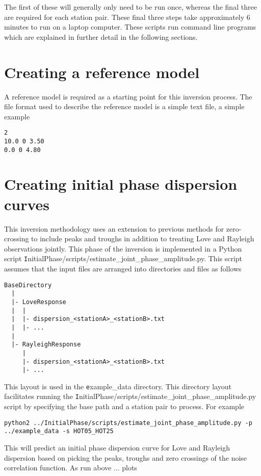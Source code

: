 \documentclass{article}
\begin{document}
The first of these will generally only need to be run once, whereas the final three
are required for each station pair. These final three steps take approximately
6 minutes to run on a laptop computer. These scripts run command line programs which
are explained in further detail in the following sections.

\section{Creating a reference model}

A reference model is required as a starting point for this inversion process. The file format used
to describe the reference model is a simple text file, a simple example

\begin{verbatim}
2
10.0 0 3.50
0.0 0 4.80
\end{verbatim}

\section{Creating initial phase dispersion curves}

This inversion methodology uses an extension to previous methods for zero-crossing to include peaks and
troughs in addition to treating Love and Rayleigh observations jointly. This phase of the inversion is
implemented in a Python script {\texttt InitialPhase/scripts/estimate\_joint\_phase\_amplitude.py}. This script
assumes that the input files are arranged into directories and files as follows

\begin{verbatim}
BaseDirectory
  |
  |- LoveResponse
  |  |
  |  |- dispersion_<stationA>_<stationB>.txt
  |  |- ...
  |
  |- RayleighResponse
     |
     |- dispersion_<stationA>_<stationB>.txt
     |- ...
\end{verbatim}

This layout is used in the {\texttt example\_data} directory. This directory layout facilitates running the
{\texttt InitialPhase/scripts/estimate\_joint\_phase\_amplitude.py} script by specifying the base path
and a station pair to process. For example

\begin{verbatim}
python2 ../InitialPhase/scripts/estimate_joint_phase_amplitude.py -p ../example_data -s HOT05_HOT25 
\end{verbatim}

This will predict an initial phase dispersion curve for Love and Rayleigh dispersion based on picking
the peaks, troughs and zero crossings of the noise correlation function. As run above ... plots
\end{document}
